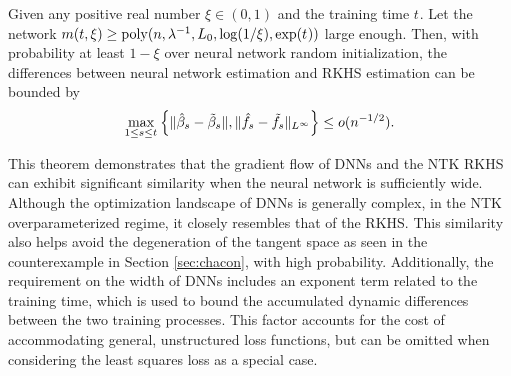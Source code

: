 \begin{theorem}\label{thm:gap} 
Given any positive real number $\xi \in(0,1)$ and the training time $t_{}$. Let the network $m(t,\xi) \geq \operatorname{poly}( n,\lambda^{-1},L_{0},\log(1/\xi), \exp (t_{}) )$ large enough.
Then, with probability at least $1-\xi$ over neural network random initialization, the differences between neural network estimation and RKHS estimation can be bounded by 
$$
\max_{1\leq s \leq t_{} } \left\{ \|\hat{\beta}_{s}-\tilde{\beta}_{s}\|, \| \hat{f}_{s} - \tilde{f}_{s} \|_{L^{\infty}} \right\}  \leq o(n^{-1/2}). 
$$
\end{theorem}


This theorem demonstrates that the gradient flow of DNNs and the NTK RKHS can exhibit significant similarity when the neural network is sufficiently wide. Although the optimization landscape of DNNs is generally complex, in the NTK overparameterized regime, it closely resembles that of the RKHS. This similarity also helps avoid the degeneration of the tangent space as seen in the counterexample in Section \ref{sec:chacon}, with high probability. Additionally, the requirement on the width of DNNs includes an exponent term related to the training time, which is used to bound the accumulated dynamic differences between the two training processes. This factor accounts for the cost of accommodating general, unstructured loss functions, but can be omitted when considering the least squares loss as a special case.






























